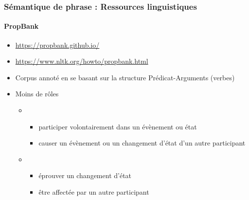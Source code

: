 \documentclass[xcolor=table]{beamer}
\begin{document}
\begin{frame}
\frametitle{Sémantique de phrase : Ressources linguistiques}
\framesubtitle{PropBank}
	
\begin{itemize}
	\item {\scriptsize \url{https://propbank.github.io/}}
	\item {\scriptsize \url{https://www.nltk.org/howto/propbank.html}}
	\item Corpus annoté en se basant sur la structure Prédicat-Arguments (verbes)
	\item Moins de rôles 
	\begin{itemize}
		\item {}
		\begin{itemize}
			\item participer volontairement dans un évènement ou état
			\item causer un évènement ou un changement d'état d'un autre participant
		\end{itemize}
		\item {}
		\begin{itemize}
			\item éprouver un changement d'état
			\item être affectée par un autre participant
		\end{itemize}
	\end{itemize}
\end{itemize}

%	
%	
	
\end{frame}
\end{document}

